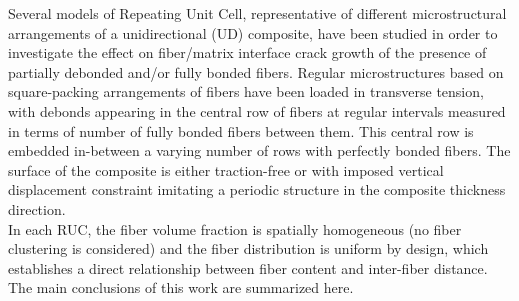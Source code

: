 Several models of Repeating Unit Cell, representative of different microstructural arrangements of a unidirectional (UD) composite, have been studied in order to investigate the effect on fiber/matrix interface crack growth of the presence of partially debonded and/or fully bonded fibers. Regular microstructures based on square-packing arrangements of fibers have been loaded in transverse tension, with debonds appearing in the central row of fibers at regular intervals measured in terms of number of fully bonded fibers between them. This central row is embedded in-between a varying number of rows with perfectly bonded fibers. The surface of the composite is either traction-free or with imposed vertical displacement constraint imitating a periodic structure in the composite thickness direction.\\
In each RUC, the fiber volume fraction is spatially homogeneous (no fiber clustering is considered) and the fiber distribution is uniform by design, which establishes a direct relationship between fiber content and inter-fiber distance. The main conclusions of this work are summarized here.
